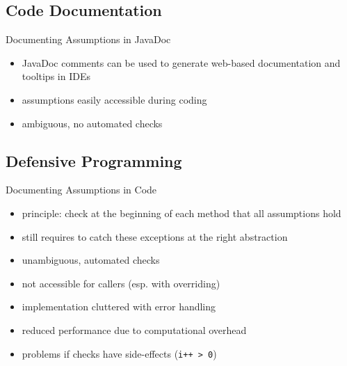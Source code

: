 \subsection{Code Documentation}
\begin{frame}{\insertsubsection}
	\begin{fancycolumns}[t]
		\begin{exampletight}{Documenting Assumptions in JavaDoc}
			\centering\makebox{\usebox{\javadoc}}
		\end{exampletight}
		\nextcolumn
		\begin{definition}{\insertsubsection}
			\begin{itemize}
				\item JavaDoc comments can be used to generate web-based documentation and tooltips in IDEs
				\item[+] assumptions easily accessible during coding
				\item[--] ambiguous, no automated checks
			\end{itemize}
		\end{definition}
	\end{fancycolumns}
\end{frame}

\subsection{Defensive Programming}
\begin{frame}{\insertsubsection}
	\begin{fancycolumns}
		\begin{exampletight}{Documenting Assumptions in Code}
			\centering{}
		\end{exampletight}
		\nextcolumn
		\begin{definition}{\insertsubsection}
			\begin{itemize}
				\item principle: check at the beginning of each method that all assumptions hold
				\item still requires to catch these exceptions at the right abstraction
				\item[+] unambiguous, automated checks
				\item[--] not accessible for callers (esp. with overriding)
				\item[--] implementation cluttered with error handling
				\item[--] reduced performance due to computational overhead
				\item[--] problems if checks have side-effects (\lstinline|i++ > 0|)
			\end{itemize}
		\end{definition}
	\end{fancycolumns}
\end{frame}

